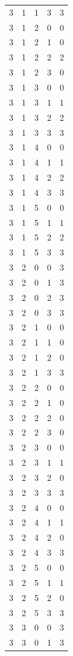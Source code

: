 \begin{longtable}{rrrrr}
3 & 1 & 1 & 3 & 3 \\
3 & 1 & 2 & 0 & 0 \\
3 & 1 & 2 & 1 & 0 \\
3 & 1 & 2 & 2 & 2 \\
3 & 1 & 2 & 3 & 0 \\
3 & 1 & 3 & 0 & 0 \\
3 & 1 & 3 & 1 & 1 \\
3 & 1 & 3 & 2 & 2 \\
3 & 1 & 3 & 3 & 3 \\
3 & 1 & 4 & 0 & 0 \\
3 & 1 & 4 & 1 & 1 \\
3 & 1 & 4 & 2 & 2 \\
3 & 1 & 4 & 3 & 3 \\
3 & 1 & 5 & 0 & 0 \\
3 & 1 & 5 & 1 & 1 \\
3 & 1 & 5 & 2 & 2 \\
3 & 1 & 5 & 3 & 3 \\
3 & 2 & 0 & 0 & 3 \\
3 & 2 & 0 & 1 & 3 \\
3 & 2 & 0 & 2 & 3 \\
3 & 2 & 0 & 3 & 3 \\
3 & 2 & 1 & 0 & 0 \\
3 & 2 & 1 & 1 & 0 \\
3 & 2 & 1 & 2 & 0 \\
3 & 2 & 1 & 3 & 3 \\
3 & 2 & 2 & 0 & 0 \\
3 & 2 & 2 & 1 & 0 \\
3 & 2 & 2 & 2 & 0 \\
3 & 2 & 2 & 3 & 0 \\
3 & 2 & 3 & 0 & 0 \\
3 & 2 & 3 & 1 & 1 \\
3 & 2 & 3 & 2 & 0 \\
3 & 2 & 3 & 3 & 3 \\
3 & 2 & 4 & 0 & 0 \\
3 & 2 & 4 & 1 & 1 \\
3 & 2 & 4 & 2 & 0 \\
3 & 2 & 4 & 3 & 3 \\
3 & 2 & 5 & 0 & 0 \\
3 & 2 & 5 & 1 & 1 \\
3 & 2 & 5 & 2 & 0 \\
3 & 2 & 5 & 3 & 3 \\
3 & 3 & 0 & 0 & 3 \\
3 & 3 & 0 & 1 & 3 \\

\end{longtable}
